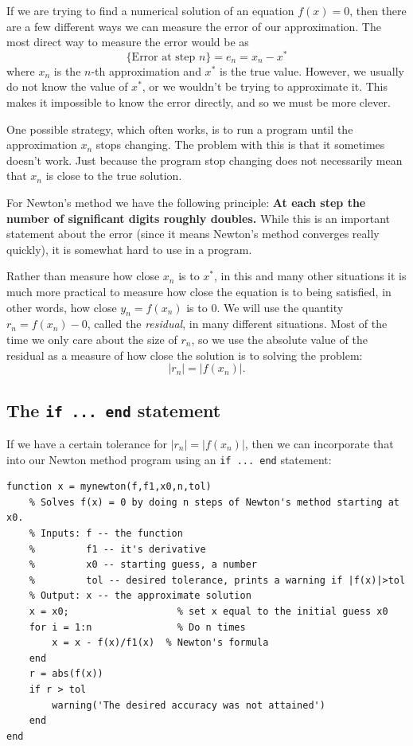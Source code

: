 If we are trying to find a numerical solution of an equation
$f(x) = 0$, then there are a few different ways we can measure
the error of our approximation. The most direct way to
measure the error would be as
$$
   \{ \text{Error at step $n$} \} = e_n = x_n - x^*
$$
where $x_n$ is the $n$-th approximation and $x^*$ is the true
value. However, we usually do not know the value of $x^*$, or
we wouldn't be trying to approximate it. This makes
it impossible to know the error directly, and so we must be
more clever.

One possible strategy, which often works,  is to
run a program until the approximation $x_n$ stops changing.
The problem with this is that it sometimes doesn't work. Just because the
program stop changing does not necessarily mean that $x_n$ is
close to the true solution.

For Newton's method we have the following principle:
{\bf At each step the number of significant digits roughly
doubles.}
While this is an important statement about the error
(since it means Newton's method
converges really quickly), it is somewhat hard to use in a
program.

Rather than measure how close $x_n$ is to $x^*$, in this and many other
situations it is much more practical to measure how close the equation
is to being satisfied, in other words, how close $y_n = f(x_n)$ is to $0$.
We will use the quantity $r_n =  f(x_n)-0$, called the {\em residual},
in many different situations. Most of the time we only care about the
size of $r_n$, so we use the absolute value of the residual as a measure
of how close the solution is to solving the problem:
$$
  |r_n|=|f(x_n)|.
$$




\subsection*{The \texttt{if ... end} statement}

If we have a certain tolerance
for $|r_n| = |f(x_n)|$, then we can incorporate that into our Newton method
program using an \verb&if ... end& statement:
\begin{lstlisting}
function x = mynewton(f,f1,x0,n,tol)
    % Solves f(x) = 0 by doing n steps of Newton's method starting at x0.
    % Inputs: f -- the function
    %         f1 -- it's derivative
    %         x0 -- starting guess, a number
    %         tol -- desired tolerance, prints a warning if |f(x)|>tol
    % Output: x -- the approximate solution
    x = x0;                   % set x equal to the initial guess x0
    for i = 1:n               % Do n times
        x = x - f(x)/f1(x)  % Newton's formula
    end
    r = abs(f(x))
    if r > tol
        warning('The desired accuracy was not attained')
    end
end
\end{lstlisting}


